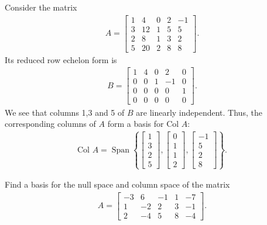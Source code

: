 \documentclass[12pt,letterpaper,reqno]{article}
\numberwithin{equation}{section}
\newcommand{\Col}{\text{Col }}
\DeclareMathOperator{\Span}{Span}
\begin{document}
\begin{example}
Consider the matrix
\begin{align*}
	A=\begin{bmatrix}
		1 & 4 & 0 & 2 & -1 \\
		3 & 12 & 1 & 5 & 5 \\
		2 & 8 & 1 & 3 & 2 \\
		5 & 20 & 2 & 8 & 8 
	\end{bmatrix}.
\end{align*}	
Its reduced row echelon form is 
\begin{align*}
	B=\begin{bmatrix}
		1 & 4 & 0 & 2 & 0 \\
		0 & 0 & 1 & -1 & 0 \\
		0 & 0 & 0 & 0 & 1 \\
		0 & 0 & 0 & 0 & 0
	\end{bmatrix}.
\end{align*}
We see that columns 1,3 and 5 of $B$ are linearly independent. Thus, the corresponding columns of $A$ form a basis for $\Col A$:
\begin{align*}
	\Col A=\Span \left\{\begin{bmatrix}
		1 \\ 3 \\ 2 \\ 5
	\end{bmatrix}, \begin{bmatrix}
		0 \\ 1 \\ 1 \\ 2
	\end{bmatrix}, \begin{bmatrix}
		-1 \\ 5 \\ 2 \\ 8
	\end{bmatrix}\right\}.
\end{align*}
\end{example}

\begin{exercise}\label{ex:rank_and_nullity_exercise}
Find a basis for the null space and column space of the matrix
\begin{align*}
	A=\begin{bmatrix}
		-3 & 6 & -1 & 1 & -7 \\
		1 & -2 & 2 & 3 & -1 \\
		2 & -4 & 5 & 8 & -4
	\end{bmatrix}.
\end{align*}	
\end{exercise}
\end{document}
